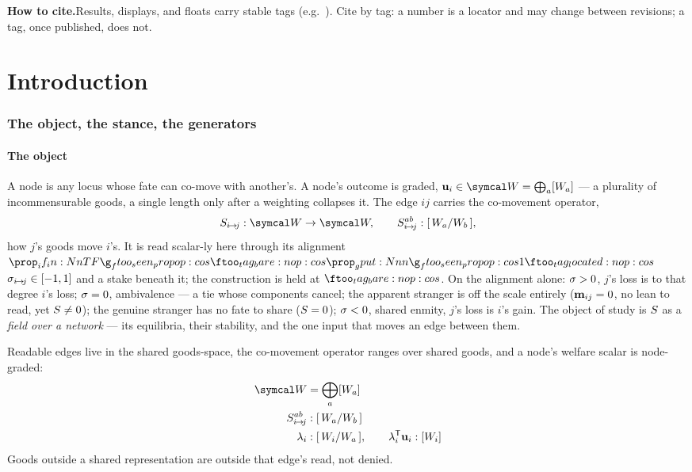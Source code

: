 \documentclass[../main]{subfiles}
\begin{document}
\begin{center}\small
  \textbf{How to cite.}\quad Results, displays, and floats carry stable tags
  (e.g.\ ). Cite by tag: a number is a locator and may change between
  revisions; a tag, once published, does not.
\end{center}

\clearpage
\begingroup\hypersetup{hidelinks}%
\tableofcontents
\endgroup


\clearpage
\part*{Introduction}
\section{The object, the stance, the generators}
\label{sec:generators}

\subsection{The object}
\label{subsec:gen:object}
%
A node is any locus whose fate can co-move with another's. A node's outcome is graded,
$\outcomevector{i}\in\outcomespace=\bigoplus_a\dimgood{a}$ --- a plurality of
incommensurable goods, a single length only after a weighting collapses it. The edge $ij$
carries the co-movement operator,
\begin{equation}
  \comov{i}{j}:\outcomespace\to\outcomespace,\qquad
  \comovcomp{i}{j}{a}{b}:\dimgoodratio{a}{b},
  \label{gen:obj}
\end{equation}
how $j$'s goods move $i$'s. It is read scalar-ly here through its alignment
$\ftag{op:cos}$ $\sigma\sb{ i\!\to\!j }\in[-1,1]$ and a stake beneath it; the construction is held at
$\ftag*{op:cos}$. On the alignment alone: $\sigma>0$, $j$'s loss is to that degree $i$'s
loss; $\sigma=0$, ambivalence --- a tie whose components cancel; the apparent stranger is
off the scale entirely ($\mathbf{m}\sb{ ij }=0$, no lean to read, yet $S\neq0$);
the genuine stranger has no fate to share ($S=0$); $\sigma<0$, shared
enmity, $j$'s loss is $i$'s gain. The object of study is $S$ as a \emph{field over a network} --- its
equilibria, their stability, and the one input that moves an edge between them.

\begin{definition}
  Readable edges live in the shared goods-space, the co-movement operator ranges over
  shared goods, and a node's welfare scalar is node-graded:
  \begin{align}
    \outcomespace &= \bigoplus_a \dimgood{a}
      \label{eq:gen:goods}\\
    \comovcomp{i}{j}{a}{b} &: \dimgoodratio{a}{b}
      \label{eq:gen:Srange}\\
    \selfweight{i} &: \dimnodepergood{i}{a}, \qquad
      \privatewelfare{i} : \dimnodewelfare{i}
      \label{eq:gen:wgrade}
  \end{align}
  Goods outside a shared representation are outside that edge's read, not denied.
\end{definition}
\end{document}
